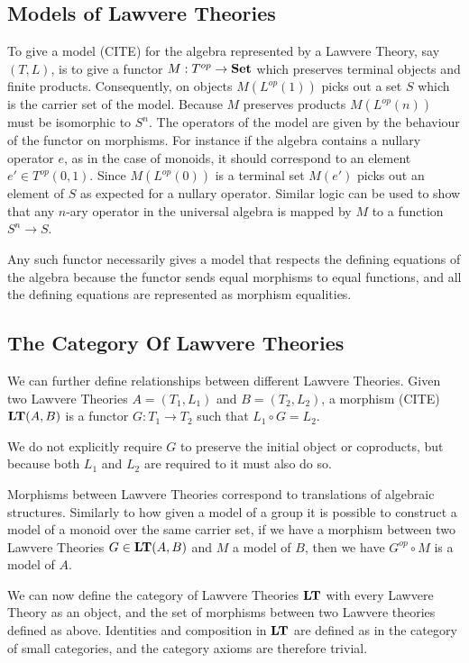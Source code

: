 \subsection{Models of Lawvere Theories}
To give a model (CITE) for the algebra represented by a Lawvere Theory, say $(T,
L)$, is to give a functor $M: T^{op}\to \mathbf{Set}$ which preserves terminal
objects and finite products. Consequently, on objects $M(L^{op}(1))$ picks out a
set $S$ which is the carrier set of the model. Because $M$ preserves products
$M(L^{op}(n))$ must be isomorphic to $S^n$. The operators of the model are given
by the behaviour of the functor on morphisms. For instance if the algebra
contains a nullary operator $e$, as in the case of monoids, it should correspond
to an element $e'\in T^{op}(0,1)$. Since $M(L^{op}(0))$ is a terminal set
$M(e')$ picks out an element of $S$ as expected for a nullary operator.
Similar logic can be used to show that any $n$-ary operator in the universal
algebra is mapped by $M$ to a function $S^n\to S$.

Any such functor necessarily gives a model that respects the defining equations
of the algebra because the functor sends equal morphisms to equal
functions, and all the defining equations are represented as morphism
equalities.

\subsection{The Category Of Lawvere Theories}
We can further define relationships between different Lawvere Theories. Given
two Lawvere Theories $A = (T_1, L_1)$ and $B = (T_2, L_2)$, a morphism (CITE)
$\mathbf{LT}(A, B)$ is a functor $G: T_1\to T_2$ such that $L_1\circ G = L_2$.

We do not explicitly require $G$ to preserve the initial object or coproducts,
but because both $L_1$ and $L_2$ are required to it must also do so.

Morphisms between Lawvere Theories correspond to translations of algebraic
structures. Similarly to how given a model of a group it is possible to
construct a model of a monoid over the same carrier set, if we have a morphism
between two Lawvere Theories $G\in \mathbf{LT}(A, B)$ and $M$ a model of $B$,
then we have $G^{op}\circ M$ is a model of $A$.

We can now define the category of Lawvere Theories $\mathbf{LT}$ with every
Lawvere Theory as an object, and the set of morphisms between two Lawvere
theories defined as above. Identities and composition in $\mathbf{LT}$ are
defined as in the category of small categories, and the category axioms are
therefore trivial.

